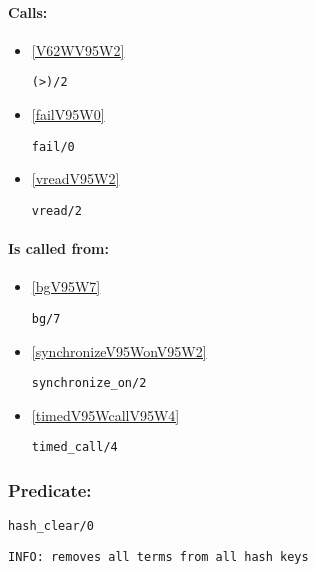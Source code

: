 \paragraph{Calls:} 
\begin{itemize}
\item \ref{V62WV95W2} 
\begin{verbatim}
(>)/2
\end{verbatim}

\item \ref{failV95W0} 
\begin{verbatim}
fail/0
\end{verbatim}

\item \ref{vreadV95W2} 
\begin{verbatim}
vread/2
\end{verbatim}

\end{itemize}
\paragraph{Is called from:} 
\begin{itemize}
\item \ref{bgV95W7} 
\begin{verbatim}
bg/7
\end{verbatim}

\item \ref{synchronizeV95WonV95W2} 
\begin{verbatim}
synchronize_on/2
\end{verbatim}

\item \ref{timedV95WcallV95W4} 
\begin{verbatim}
timed_call/4
\end{verbatim}

\end{itemize}

\subsubsection{Predicate:} \label{hashV95WclearV95W0}

\begin{verbatim}
hash_clear/0
\end{verbatim}

{\small \begin{verbatim}
INFO: removes all terms from all hash keys

\end{verbatim}}

